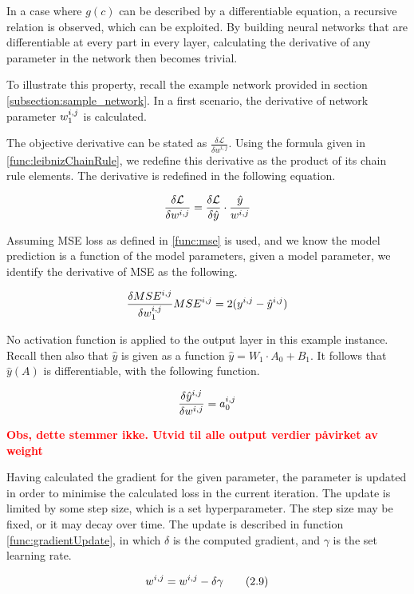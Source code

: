 In a case where $ g(c) $ can be described by a differentiable equation, a recursive relation is observed, which can be exploited. 
By building neural networks that are differentiable at every part in every layer, calculating the derivative of any parameter in the network then becomes trivial.

To illustrate this property, recall the example network provided in section \ref{subsection:sample_network}. 
In a first scenario, the derivative of network parameter $ w_1^{i,\space j} $ is calculated.

The objective derivative can be stated as $ \frac{\delta \mathcal{L}}{\delta w^{i, j}} $.
Using the formula given in \ref{func:leibnizChainRule}, we redefine this derivative as the product of its chain rule elements.
The derivative is redefined in the following equation.


$$ \frac{\delta \mathcal{L}}{\delta w^{i, \space j}} = \frac{\delta \mathcal{L}}{\delta \hat{y}} \cdot \frac{\hat{y}}{w^{i, \space j}} $$


Assuming MSE loss as defined in \ref{func:mse} is used, and we know the model prediction is a function of the model parameters, 
given a model parameter, we identify the derivative of MSE as the following.


\[
    \frac{\delta MSE^{i, j}}{\delta w_1^{i, \space j}} MSE^{i, j} = 2(y^{i, j} - \hat{y}^{i, j})
\]


No activation function is applied to the output layer in this example instance. Recall then also that $ \hat{y} $ is given as a function $ \hat{y} = W_1 \cdot A_0 + B_1 $. 
It follows that $ \hat{y}(A) $ is differentiable, with the following function.

\[
    \frac{\delta \hat{y}^{i, j}}{\delta w^{i,\space j}} = a_0^{i, \space j}
\]


\textcolor{red}{\textbf{Obs, dette stemmer ikke. Utvid til alle output verdier påvirket av weight}}



Having calculated the gradient for the given parameter, the parameter is updated in order to minimise the calculated loss in the current iteration. 
The update is limited by some step size, which is a set hyperparameter. The step size may be fixed, or it may decay over time.
The update is described in function \ref{func:gradientUpdate}, in which $ \delta $ is the computed gradient, and $ \gamma $ is the set learning rate.


\[ w^{i, \space j} = w^{i, \space j} - \delta \gamma \tag{2.9}  \label{func:gradientUpdate} \]

